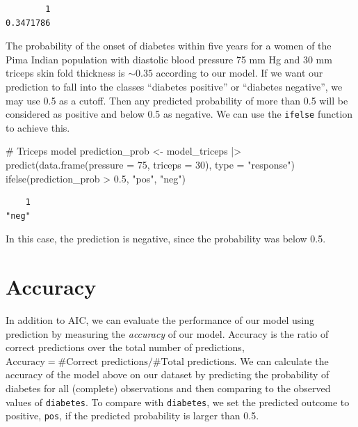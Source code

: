 \documentclass[
  letterpaper,
  DIV=11,
  numbers=noendperiod]{scrreprt}
\newenvironment{Shaded}{\begin{snugshade}}{\end{snugshade}}
\newcommand{\AttributeTok}[1]{\textcolor[rgb]{0.40,0.45,0.13}{#1}}
\newcommand{\CommentTok}[1]{\textcolor[rgb]{0.37,0.37,0.37}{#1}}
\newcommand{\DecValTok}[1]{\textcolor[rgb]{0.68,0.00,0.00}{#1}}
\newcommand{\FloatTok}[1]{\textcolor[rgb]{0.68,0.00,0.00}{#1}}
\newcommand{\FunctionTok}[1]{\textcolor[rgb]{0.28,0.35,0.67}{#1}}
\newcommand{\NormalTok}[1]{\textcolor[rgb]{0.00,0.23,0.31}{#1}}
\newcommand{\OtherTok}[1]{\textcolor[rgb]{0.00,0.23,0.31}{#1}}
\newcommand{\SpecialCharTok}[1]{\textcolor[rgb]{0.37,0.37,0.37}{#1}}
\newcommand{\StringTok}[1]{\textcolor[rgb]{0.13,0.47,0.30}{#1}}
\begin{document}
\begin{verbatim}
        1 
0.3471786 
\end{verbatim}

The probability of the onset of diabetes within five years for a women
of the Pima Indian population with diastolic blood pressure 75 mm Hg and
30 mm triceps skin fold thickness is \(\sim 0.35\) according to our
model. If we want our prediction to fall into the classes ``diabetes
positive'' or ``diabetes negative'', we may use 0.5 as a cutoff. Then
any predicted probability of more than 0.5 will be considered as
positive and below 0.5 as negative. We can use the \texttt{ifelse}
function to achieve this.

\begin{Shaded}
\begin{Highlighting}[]
\CommentTok{\# Triceps model}
\NormalTok{prediction\_prob }\OtherTok{\textless{}{-}}\NormalTok{ model\_triceps }\SpecialCharTok{|\textgreater{}} \FunctionTok{predict}\NormalTok{(}\FunctionTok{data.frame}\NormalTok{(}\AttributeTok{pressure =} \DecValTok{75}\NormalTok{, }\AttributeTok{triceps =} \DecValTok{30}\NormalTok{), }\AttributeTok{type =} \StringTok{"response"}\NormalTok{)}
\FunctionTok{ifelse}\NormalTok{(prediction\_prob }\SpecialCharTok{\textgreater{}} \FloatTok{0.5}\NormalTok{, }\StringTok{"pos"}\NormalTok{, }\StringTok{"neg"}\NormalTok{)}
\end{Highlighting}
\end{Shaded}

\begin{verbatim}
    1 
"neg" 
\end{verbatim}

In this case, the prediction is negative, since the probability was
below 0.5.

\section{Accuracy}\label{accuracy}

In addition to AIC, we can evaluate the performance of our model using
prediction by measuring the \emph{accuracy} of our model. Accuracy is
the ratio of correct predictions over the total number of predictions,
\(\text{Accuracy} = \#\text{Correct predictions} / \#\text{Total predictions}\).
We can calculate the accuracy of the model above on our dataset by
predicting the probability of diabetes for all (complete) observations
and then comparing to the observed values of \texttt{diabetes}. To
compare with \texttt{diabetes}, we set the predicted outcome to
positive, \texttt{pos}, if the predicted probability is larger than 0.5.
\end{document}
